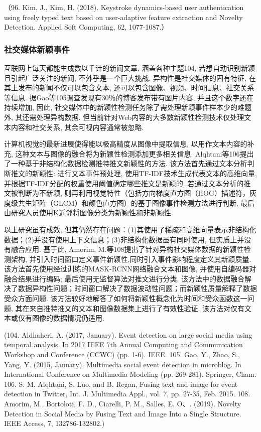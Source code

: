 \documentclass{Style/aas}
\begin{document}
\begin{multicols}{2}
  （96.	Kim, J., Kim, H. (2018). Keystroke dynamics-based user authentication using freely typed text based on user-adaptive feature extraction and Novelty Detection. Applied Soft Computing, 62, 1077-1087.）

  \subsubsection{社交媒体新颖事件}
  互联网上每天都能生成数以千计的新闻文章, 涵盖各种主题104, 若想自动识别新颖且引起广泛关注的新闻, 不外乎是一个巨大挑战. 异构性是社交媒体的固有特征, 在其上发布的新闻不仅可以包含文本, 还可以包含图像、视频、时间信息、社交关系等信息. 据Gao等105调查发现有30％的博客发布带有图片内容, 并且这个数字还在持续增加, 因此, 社交媒体中的新颖性检测任务除了需处理新颖事件样本少的难题外, 其还需处理异构数据. 但当前针对Web内容的大多数新颖性检测技术仅处理文本内容和社交关系, 其余可视内容通常被忽略.

  计算机视觉的最新进展使得能以极高精度从图像中提取信息, 以用作文本内容的补充, 这种文本与图像的融合将为新颖性检测添加更多相关信息. Alqhtani等106提出了一种基于非结构化数据检测推特推文新颖性的方法. 该方法首先通过文本分析判断推文的新颖性: 进行文本事件预处理, 使用TF-IDF技术生成代表文本的高维向量, 并根据TF-IDF分配的权重使用阈值确定哪些推文是新颖的. 若通过文本分析的推文被判断为不新颖, 则再利用视觉特性（包括方向梯度直方图（HOG）描述符，灰度级共生矩阵（GLCM）和颜色直方图）的基于图像事件检测方法进行判断, 最后由研究人员使用K近邻将图像分类为新颖性和非新颖性.

  以上研究虽有成效, 但其仍然存在问题：(1)其使用了稀疏和高维向量表示非结构化数据；(2)并没有使用上下文信息；(3)非结构化数据虽有同时使用, 但实质上并没有融合应用. 基于此, Amorim, M.等108提出了针对异构社交媒体数据的新颖性检测架构, 并引入时间窗口定义事件新颖性,同时引入事件影响程度定义其新颖质量.该方法首先使用经过训练的MASK-RCNN网络融合文本和图像, 并使用自编码器对融合结果进行编码; 最后使用无监督算法对推文进行分类. 该方法中的数据融合解决了数据异构性问题；时间窗口解决了数据波动性问题；而新颖性质量解释了数据受众方面问题. 该方法较好地解答了如何将新颖性概念化为时间和受众函数这一问题, 其在来自推特推文的文本和图像数据集上进行了有效性验证. 该方法对仅有文本或仅有图像的数据情况仍适用.

  (104.	Aldhaheri, A. (2017, January). Event detection on large social media using temporal analysis. In 2017 IEEE 7th Annual Computing and Communication Workshop and Conference (CCWC) (pp. 1-6). IEEE.
  105.	Gao, Y., Zhao, S., Yang, Y. (2015, January). Multimedia social event detection in microblog. In International Conference on Multimedia Modeling (pp. 269-281). Springer, Cham.
  106.	S. M. Alqhtani, S. Luo, and B. Regan, Fusing text and image for event detection in Twitter, Int. J. Multimedia Appl., vol. 7, pp. 27-35, Feb. 2015.
  108.	Amorim, M., Bortoloti, F. D., Ciarelli, P. M., Salles, E. O、. (2019). Novelty Detection in Social Media by Fusing Text and Image Into a Single Structure. IEEE Access, 7, 132786-132802.)


\end{multicols}
\end{document}
